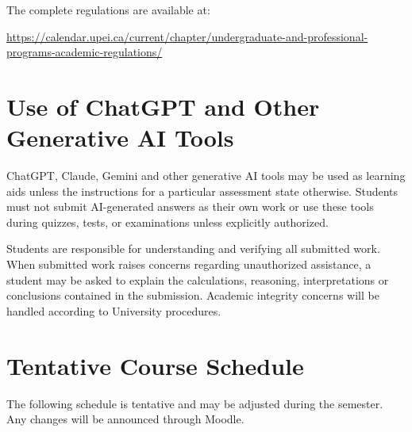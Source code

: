 \documentclass[10pt]{article}
\begin{document}
The complete regulations are available at:

\url{https://calendar.upei.ca/current/chapter/undergraduate-and-professional-programs-academic-regulations/}


\section{Use of ChatGPT and Other Generative AI Tools}
ChatGPT, Claude, Gemini and other generative AI tools may be used as learning aids unless the instructions for a particular assessment state otherwise. Students must not submit AI-generated answers as their own work or use these tools during quizzes, tests, or examinations unless explicitly authorized.

Students are responsible for understanding and verifying all submitted work. When submitted work raises concerns regarding unauthorized assistance, a student may be asked to explain the calculations, reasoning, interpretations or conclusions contained in the submission. Academic integrity concerns will be handled according to University procedures.

\newpage


\section{Tentative Course Schedule}

The following schedule is tentative and may be adjusted during the semester. Any changes will be announced through Moodle.
\end{document}
